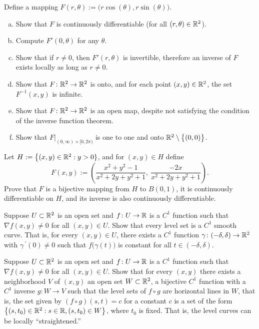 \begin{exercise} \label{mv:exercise:polarcoordinates}
Define a mapping $F(r,\theta) := \bigl(r \cos(\theta), r \sin(\theta) \bigr)$.
\begin{enumerate}[a)]
\item
Show that $F$ is continuously differentiable (for all $(r,\theta) \in
{\mathbb{R}}^2$).
\item
Compute $F'(0,\theta)$ for any $\theta$.
\item
Show that if $r \not= 0$, then $F'(r,\theta)$ is invertible, therefore an
inverse of $F$ exists locally as long as $r \not= 0$.
\item
Show that $F \colon {\mathbb{R}}^2 \to {\mathbb{R}}^2$ is onto, and for each point $(x,y) \in
{\mathbb{R}}^2$, the set $F^{-1}(x,y)$ is infinite.
\item
Show that $F \colon {\mathbb{R}}^2 \to {\mathbb{R}}^2$ is an open map, despite not satisfying the condition of the
inverse function theorem.
\item
Show that $F|_{(0,\infty) \times [0,2\pi)}$ is one to one and onto
${\mathbb{R}}^2 \setminus \bigl\{ (0,0) \bigr\}$.
\end{enumerate}
\end{exercise}

\begin{exercise}
Let $H := \bigl\{ (x,y) \in {\mathbb{R}}^2 : y > 0 \}$, and for $(x,y) \in H$
define
\begin{equation*}
F(x,y) := \left(
\frac{x^2+y^2-1}{x^2+2y+y^2+1}
,~
\frac{-2x}{x^2+2y+y^2+1}
\right) .
\end{equation*}
Prove that $F$ is a bijective mapping from $H$ to $B(0,1)$, it is
continuously differentiable on $H$, and its inverse is also continuously
differentiable.
\end{exercise}

\begin{exercise}
Suppose $U \subset {\mathbb{R}}^2$ is an open set and $f \colon U \to {\mathbb{R}}$ is
a $C^1$ function such
that $\nabla f(x,y) \not= 0$ for all $(x,y) \in U$.  Show that every
level set is a $C^1$ smooth curve.  That is,
for every
$(x,y) \in U$, there exists a $C^1$ function $\gamma \colon (-\delta,\delta)
\to {\mathbb{R}}^2$ with $\gamma^{\:\prime}(0) \not= 0$ such that
$f\bigl(\gamma(t)\bigr)$ is constant for all $t \in (-\delta,\delta)$.
\end{exercise}

\begin{exercise}
Suppose $U \subset {\mathbb{R}}^2$ is an open set and $f \colon U \to {\mathbb{R}}$ is
a $C^1$ function such
that $\nabla f(x,y) \not= 0$ for all $(x,y) \in U$.
Show that for every $(x,y)$ there exists a neighborhood $V$ of $(x,y)$
an open set $W \subset {\mathbb{R}}^2$, a bijective $C^1$ function with
a $C^1$ inverse $g \colon W \to V$ such that
the level sets of $f \circ g$ are horizontal lines in $W$, that is,
the set given by $(f \circ g) (s,t) = c$ for a constant $c$ is a set of the form
$\bigl\{ (s,t_0) \in {\mathbb{R}}^2 : s \in {\mathbb{R}}, (s,t_0) \in W \bigr\}$, where $t_0$ is fixed.
That is, the level curves can be locally ``straightened.''
\end{exercise}

